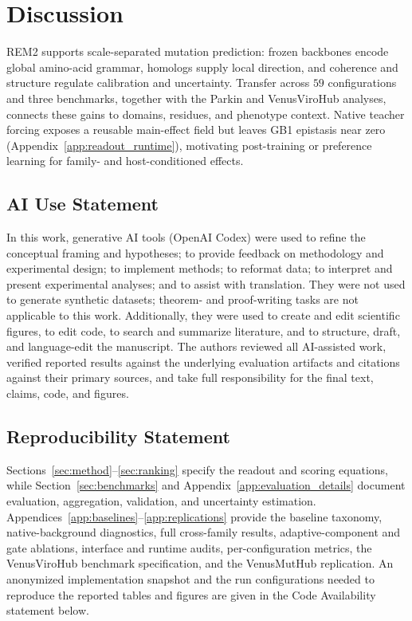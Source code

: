 \documentclass{article} %
\begin{document}
\FloatBarrier

\section{Discussion}
\label{sec:discussion}

\textsc{REM2} supports scale-separated mutation prediction: frozen backbones encode global amino-acid grammar, homologs supply local direction, and coherence and structure regulate calibration and uncertainty. Transfer across $59$ configurations and three benchmarks, together with the Parkin and VenusViroHub analyses, connects these gains to domains, residues, and phenotype context. Native teacher forcing exposes a reusable main-effect field but leaves GB1 epistasis near zero (Appendix~\ref{app:readout_runtime}), motivating post-training or preference learning for family- and host-conditioned effects.

\subsection*{AI Use Statement}
In this work, generative AI tools (OpenAI Codex) were used to refine the conceptual framing and hypotheses; to provide feedback on methodology and experimental design; to implement methods; to reformat data; to interpret and present experimental analyses; and to assist with translation. They were not used to generate synthetic datasets; theorem- and proof-writing tasks are not applicable to this work. Additionally, they were used to create and edit scientific figures, to edit code, to search and summarize literature, and to structure, draft, and language-edit the manuscript. The authors reviewed all AI-assisted work, verified reported results against the underlying evaluation artifacts and citations against their primary sources, and take full responsibility for the final text, claims, code, and figures.

\subsection*{Reproducibility Statement}
Sections~\ref{sec:method}--\ref{sec:ranking} specify the readout and scoring equations, while Section~\ref{sec:benchmarks} and Appendix~\ref{app:evaluation_details} document evaluation, aggregation, validation, and uncertainty estimation. Appendices~\ref{app:baselines}--\ref{app:replications} provide the baseline taxonomy, native-background diagnostics, full cross-family results, adaptive-component and gate ablations, interface and runtime audits, per-configuration metrics, the VenusViroHub benchmark specification, and the VenusMutHub replication. An anonymized implementation snapshot and the run configurations needed to reproduce the reported tables and figures are given in the Code Availability statement below.
\end{document}
